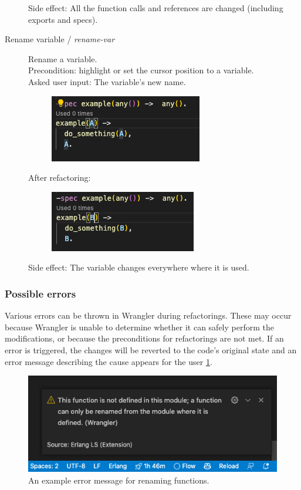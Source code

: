 \begin{description}
\begin{figure}[H]
    \end{figure}
	Side effect: All the function calls and references are changed (including exports and specs).
	\item[Rename variable / \textit{rename-var}] Rename a variable.
	\\Precondition: highlight or set the cursor position to a variable.
	\\Asked user input: The variable's new name. 
    \begin{figure}[H]
	\centering
	\includegraphics[]{images/rename_var_before.png}
    \end{figure}
	After refactoring:
	\begin{figure}[H]
	\centering
	\includegraphics[]{images/rename_var_after.png}
    \end{figure}
	Side effect: The variable changes everywhere where it is used.
\end{description}

\subsubsection{Possible errors}

Various errors can be thrown in Wrangler during refactorings. These may occur because Wrangler is unable to determine whether it can safely perform the modifications, or because the preconditions for refactorings are not met.
If an error is triggered, the changes will be reverted to the code's original state and an error message describing the cause appears for the user \ref{fig:error}.

\begin{figure}[H]
\centering
\includegraphics[width=1\textwidth]{images/errors.png}
\caption{An example error message for renaming functions.}
\label{fig:error}
\end{figure}

